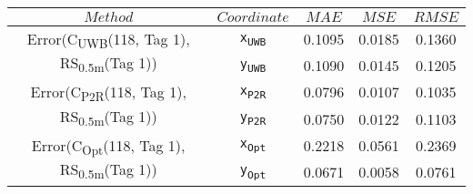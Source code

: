 \begin{table}[h]
\centering
\begin{tabular}{|c|c|c|c|c|}
\hline
$Method$ & $Coordinate$ & $MAE$ & $MSE$ & $RMSE$ \\
\hline
\multirow{2}{*}{{\footnotesize Error(C\textsubscript{UWB}(118, Tag 1), RS\textsubscript{0.5m}(Tag 1))}} & \texttt{x\textsubscript{UWB}} & 0.1095 & 0.0185 & 0.1360 \\
& \texttt{y\textsubscript{UWB}} & 0.1090 & 0.0145 & 0.1205 \\
\hline
\multirow{2}{*}{{\footnotesize Error(C\textsubscript{P2R}(118, Tag 1), RS\textsubscript{0.5m}(Tag 1))}} & \texttt{x\textsubscript{P2R}} & 0.0796 & 0.0107 & 0.1035 \\
& \texttt{y\textsubscript{P2R}} & 0.0750 & 0.0122 & 0.1103 \\
\hline
\multirow{2}{*}{{\footnotesize Error(C\textsubscript{Opt}(118, Tag 1), RS\textsubscript{0.5m}(Tag 1))}} & \texttt{x\textsubscript{Opt}} & 0.2218 & 0.0561 & 0.2369 \\
& \texttt{y\textsubscript{Opt}} & 0.0671 & 0.0058 & 0.0761 \\
\hline
\end{tabular}
\end{table}
